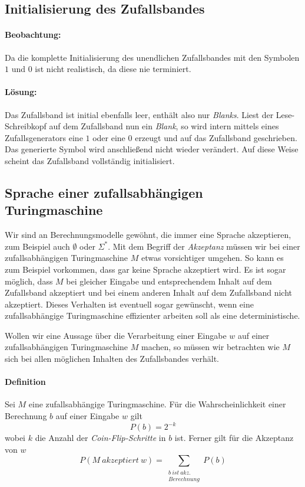 \subsection{Initialisierung des Zufallsbandes}
\paragraph{Beobachtung:}
Da die komplette Initialisierung des unendlichen Zufallsbandes mit den Symbolen $1$ und $0$ ist nicht realistisch, da diese nie terminiert.

\paragraph{Lösung:}
Das Zufallsband ist initial ebenfalls leer, enthält also nur \emph{Blanks}. 
Liest der Lese-Schreibkopf auf dem Zufallsband nun ein \emph{Blank}, so wird intern mittels eines Zufallsgenerators eine $1$ oder eine $0$ erzeugt und auf das Zufallsband geschrieben.
Das generierte Symbol wird anschließend nicht wieder verändert.
Auf diese Weise scheint das Zufallsband vollständig initialisiert.


\subsection{Sprache einer zufallsabhängigen Turingmaschine}
Wir sind an Berechnungsmodelle gewöhnt, die immer eine Sprache akzeptieren, zum Beispiel auch $\emptyset$ oder $\Sigma^*$.
Mit dem Begriff der \emph{Akzeptanz} müssen wir bei einer zufallsabhängigen Turingmaschine $M$ etwas vorsichtiger umgehen.
So kann es zum Beispiel vorkommen, dass gar keine Sprache akzeptiert wird.
Es ist sogar möglich, dass $M$ bei gleicher Eingabe und entsprechendem Inhalt auf dem Zufallsband akzeptiert und bei einem anderen Inhalt auf dem Zufallsband nicht akzeptiert.
Dieses Verhalten ist eventuell sogar gewünscht, wenn eine zufallsabhängige Turingmaschine effizienter arbeiten soll als eine deterministische.

Wollen wir eine Aussage über die Verarbeitung einer Eingabe $w$ auf einer zufallsabhängigen Turingmaschine $M$ machen, so müssen wir betrachten wie $M$ sich bei allen möglichen Inhalten des Zufallsbandes verhält.

\paragraph{Definition}
Sei $M$ eine zufallsabhängige Turingmaschine.
Für die Wahrscheinlichkeit einer Berechnung $b$ auf einer Eingabe $w$ gilt
\begin{equation*}
	P(b) = 2^{-k}
\end{equation*}
wobei $k$ die Anzahl der \emph{Coin-Flip-Schritte} in $b$ ist. 
Ferner gilt für die Akzeptanz von $w$
\begin{equation*}
	P(M\ akzeptiert\ w) = \sum_{\substack{b\ ist\ akz.\\ Berechnung}} P(b) 
\end{equation*}

